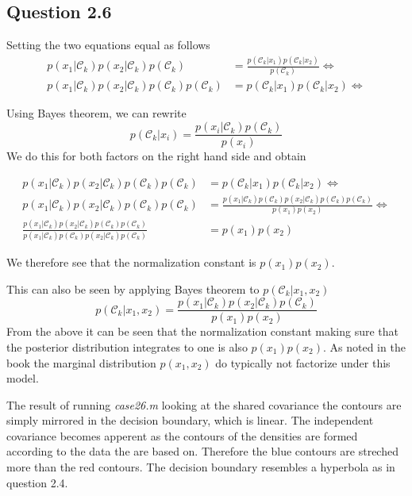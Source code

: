 \subsection*{Question 2.6}

Setting the two equations equal as follows
\begin{align*}
p(x_1|\mathcal{C}_k)p(x_2|\mathcal{C}_k)p(\mathcal{C}_k) & = \frac{p(\mathcal{C}_k | x_1)p(\mathcal{C}_k | x_2)}{p(\mathcal{C}_k)} \iff \\
p(x_1|\mathcal{C}_k)p(x_2|\mathcal{C}_k)p(\mathcal{C}_k)p(\mathcal{C}_k) & = p(\mathcal{C}_k | x_1)p(\mathcal{C}_k | x_2) \iff
\end{align*}

Using Bayes theorem, we can rewrite
\[
p(\mathcal{C}_k | x_i) = \frac{p(x_i | \mathcal{C}_k)p(\mathcal{C}_k)}{p(x_i)}
\]
We do this for both factors on the right hand side and obtain

\begin{align*}
p(x_1|\mathcal{C}_k)p(x_2|\mathcal{C}_k)p(\mathcal{C}_k)p(\mathcal{C}_k) & = p(\mathcal{C}_k | x_1)p(\mathcal{C}_k | x_2) \iff \\
p(x_1|\mathcal{C}_k)p(x_2|\mathcal{C}_k)p(\mathcal{C}_k)p(\mathcal{C}_k) & = \frac{p(x_1|\mathcal{C}_k)p(\mathcal{C}_k)p(x_2|\mathcal{C}_k)p(\mathcal{C}_k)p(\mathcal{C}_k)}{p(x_1)p(x_2)} \iff \\
\frac{p(x_1|\mathcal{C}_k)p(x_2|\mathcal{C}_k)p(\mathcal{C}_k)p(\mathcal{C}_k)}{p(x_1|\mathcal{C}_k)p(\mathcal{C}_k)p(x_2|\mathcal{C}_k)p(\mathcal{C}_k)} & = p(x_1)p(x_2)
\end{align*}

We therefore see that the normalization constant is $p(x_1)p(x_2)$.

This can also be seen by applying Bayes theorem to $p(\mathcal{C}_k|x_1, x_2)$
\begin{equation*}
p(\mathcal{C}_k|x_1, x_2) = \frac{p(x_1|\mathcal{C}_k)p(x_2|\mathcal{C}_k)p(\mathcal{C}_k)}{p(x_1)p(x_2)}
\end{equation*}
From the above it can be seen that the normalization constant making
sure that the posterior distribution integrates to one is also
$p(x_1)p(x_2)$. As noted in the book the marginal distribution
$p(x_1,x_2)$ do typically not factorize under this model.

The result of running \emph{case26.m} looking at the shared covariance
the contours are simply mirrored in the decision boundary, which is
linear. The independent covariance becomes apperent as the contours of
the densities are formed according to the data the are based
on. Therefore the blue contours are streched more than the red
contours. The decision boundary resembles a hyperbola as in question
2.4.
